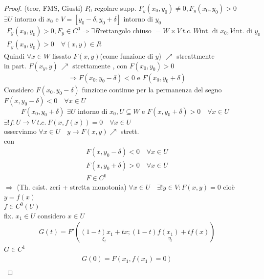 \documentclass[a4paper, oneside]{article}
\begin{document}
\begin{proof}
    (teor, FMS, Giusti) $P_0$ regolare supp. $F_y(x_0,y_0) \neq 0 , F_y(x_0,y_0) > 0$\\
     $\exists U$ intorno di $x_0$ e  $V = [y_0-\delta,y_0+\delta]$ intorno di $y_0$   
    \begin{gather*}
        F_y(x_0,y_0) > 0, F_y \in C^0 \Rightarrow \exists R \text{rettangolo chiuso } = W \times V \ t.c. \ W \text{int. di } x_0, V \text{int. di } y_0\\
        F_y (x_0,y_0) > 0 \quad \forall (x,y) \in R
    \end{gather*}
    Quindi $\forall x \in W $ fissato $F(x,y)$(come funzione di $y$) $\nearrow$ streattmente\\
    in part. $F(x_y,y) \ \nearrow $ strettamente , con $F(x_0,y_0) > 0$\\
    \begin{gather*}
        \Rightarrow F(x_0,y_0-\delta) < 0 \text{ e } F(x_0,y_0+\delta)
    \end{gather*} 
    Considero $F(x_0,y_0-\delta)$ funzione continue per la permanenza del segno $F(x,y_0-\delta) < 0 \quad \forall x \in U$\\
    \ \ \ \ \ $F(x_0,y_0+\delta)$ $\exists U $ intorno di $x_0, U \subseteq W$ e $F(x,y_0+\delta) > 0\quad  \forall x \in U$\\
    $\exists! f:U \to V \ t.c. \ F(x,f(x)) = 0 \quad \forall x \in U$\\
    osserviamo $\forall x \in U \quad y \to F(x,y) \nearrow $ strett.\\
    con\begin{gather*}
        F(x,y_0-\delta) <0 \quad \forall x \in U \\
        F(x,y_0+\delta) >0 \quad \forall x \in U \\
        F \in C^0
    \end{gather*}
    $\Rightarrow$ (Th. esist. zeri + stretta monotonia) $\forall x \in U \quad \exists! y \in V:F(x,y) = 0$ cioè $y=f(x)$\\
     $f\in C^0(U)$\\
    fix. $x_1 \in U$ considero $x \in U$
    \begin{gather*}
        G(t) = F'\left( \underset{\xi_t }{(1-t)x_1 +tx} ; \underset{\eta_t }{(1-t)f(x_1) + tf(x) }\right) 
    \end{gather*}
    $G \in C^1$
    \begin{gather*}
        G(0) = F(x_1,f(x_1) = 0)\\

\end{gather*}
\end{proof}
\end{document}

